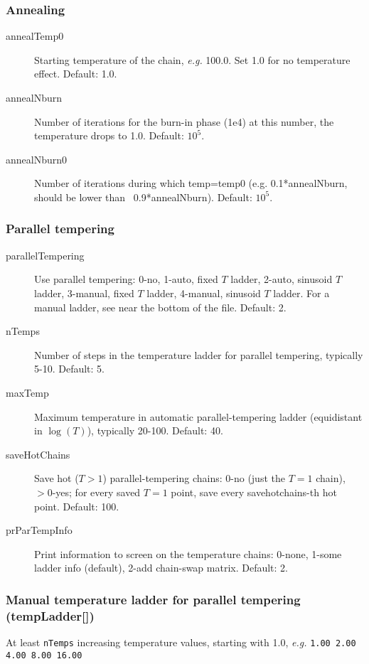 \documentclass[10pt]{article}
\begin{document}
\subsubsection{Annealing}
\begin{description}
\item[annealTemp0] Starting temperature of the chain, \textit{e.g.} 100.0. Set 1.0 for no temperature effect.  Default: 1.0.
\item[annealNburn] Number of iterations for the burn-in phase (1e4) at this number, the temperature drops to 1.0.  Default: $10^5$.
\item[annealNburn0] Number of iterations during which temp=temp0 (e.g. 0.1*annealNburn, should be lower than ~0.9*annealNburn).  Default: $10^5$.
\end{description}

\subsubsection{Parallel tempering}
\begin{description}
\item[parallelTempering] Use parallel tempering:  0-no,  1-auto, fixed $T$ ladder,  2-auto, sinusoid $T$ ladder,  3-manual, fixed $T$ ladder,  4-manual, sinusoid $T$ ladder.  For a manual ladder, see near the bottom of the file.  Default: 2.
\item[nTemps] Number of steps in the temperature ladder for parallel tempering, typically 5-10.  Default: 5.
\item[maxTemp] Maximum temperature in automatic parallel-tempering ladder (equidistant in $\log(T)$), typically 20-100.  Default: 40.
\item[saveHotChains] Save hot ($T>1$) parallel-tempering chains: 0-no (just the $T=1$ chain), $>0$-yes; for every saved $T=1$ point, save every savehotchains-th hot point.  Default: 100.
\item[prParTempInfo] Print information to screen on the temperature chains: 0-none, 1-some ladder info (default), 2-add chain-swap matrix.  Default: 2.
\end{description}

\subsubsection{Manual temperature ladder for parallel tempering (tempLadder[])}
At least \texttt{nTemps} increasing temperature values, starting with 1.0, \textit{e.g.} \texttt{1.00     2.00     4.00     8.00     16.00}
    
\end{document}
